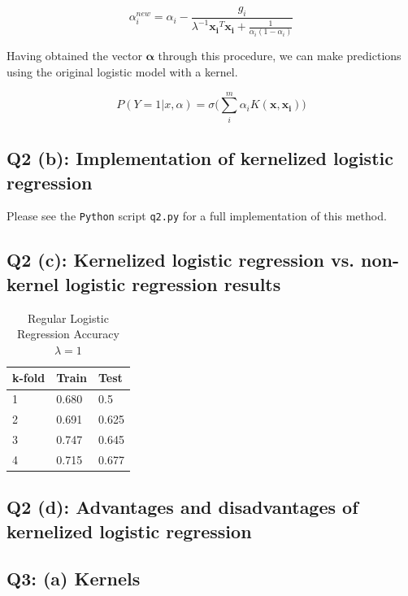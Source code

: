 \documentclass[11pt]{amsart}
\newcommand{\vek}[1]{\mathbf{#1}}
\begin{document}
\begin{equation}
\alpha_i^{new} = \alpha_i - \frac{g_i}{\lambda^{-1}\vek{x_i}^T\vek{x_i} + \frac{1}{\alpha_i(1-\alpha_i)}}
\end{equation}

Having obtained the vector $\vek{\alpha}$ through this procedure, we can make predictions using the original logistic model with a kernel.

\begin{equation}
P(Y=1 \vert x, \alpha) = \sigma\bigg(\sum_i^{m} \alpha_i K(\vek{x}, \vek{x_i})\bigg)
\end{equation}


\subsection{Q2 (b): Implementation of kernelized logistic regression}

Please see the \texttt{Python} script \texttt{q2.py} for a full implementation of this method.

\subsection{Q2 (c): Kernelized logistic regression vs. non-kernel logistic regression results}

\begin{table}[h!]
\centering
\begin{tabular}{lll}
\hline
k-fold & Train & Test  \\ \hline
1      & 0.680 & 0.5   \\ \hline
2      & 0.691 & 0.625 \\ \hline
3      & 0.747 & 0.645 \\ \hline
4      & 0.715 & 0.677 \\ \hline
\end{tabular}
\caption{Regular Logistic Regression Accuracy $\lambda=1$}
\label{fig:q2c_reg}
\end{table}

\subsection{Q2 (d): Advantages and disadvantages of kernelized logistic regression}

\subsection{Q3: (a) Kernels}
\end{document}
